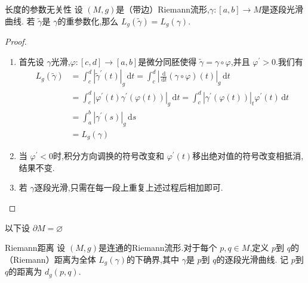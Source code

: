 \documentclass[../../几何与拓扑.tex]{subfiles}
\begin{document}
\begin{proposition}{长度的参数无关性}
    设 $ \left( M,g \right)  $是（带边）Riemann流形,$ \gamma:[a,b]\to M $是逐段光滑曲线.
    若 $ \tilde{\gamma} $是 $ \gamma $的重参数化,那么 $ L_{g}\left( \tilde{\gamma} \right)=L_{g}\left( \gamma \right)   $.     
\end{proposition}
\begin{proof}
    \begin{enumerate}
        \item 首先设 $ \gamma $光滑,$ \varphi:[c,d]\to [a,b] $是微分同胚使得 $ \tilde{\gamma}=\gamma\circ \varphi $,并且 $ \varphi^{\prime} >0 $.我们有 $$
        \begin{aligned}
        L_{g}\left( \tilde{\gamma} \right)  & = \int_{c}^{d}\left| \tilde{\gamma}^{\prime} \left( t \right)  \right|_{g} \,\mathrm{d} t=  \int_{c}^{d}\left| \frac{\,\mathrm{d}  }{\,\mathrm{d} t }  \left( \gamma\circ \varphi \right)\left( t \right)  \right|_{g}\,\mathrm{d} t\\ 
         & = \int_{c}^{d} \left| \varphi^{\prime} \left( t \right)\gamma^{\prime} \left( \varphi\left( t \right)  \right)   \right|_{g}  \,\mathrm{d} t = \int_{c}^{d} \left| \gamma^{\prime} \left( \varphi\left( t \right)  \right)  \right|_{t} \varphi^{\prime} \left( t \right)\,\mathrm{d} t\\ 
          & = \int_{a}^{b}  \left| \gamma^{\prime} \left( s \right)  \right| _{g}\,\mathrm{d} s\\ 
           & = L_{g}\left( \gamma \right) 
        \end{aligned}
        $$     
        \item 当 $ \varphi^{\prime} <0 $时,积分方向调换的符号改变和 $ \varphi^{\prime} \left( t \right)  $移出绝对值的符号改变相抵消,结果不变.
        \item 若 $ \gamma $逐段光滑,只需在每一段上重复上述过程后相加即可. 
    \end{enumerate}
    
\end{proof}

以下设 $ \partial M = \varnothing $ 

\begin{definition}{Riemann距离}
    设 $ \left( M,g \right)  $是连通的Riemann流形.对于每个 $ p,q\in M $,定义 $ p $到 $ q $的（Riemann）距离为全体 $ L_{g}\left( \gamma \right)  $的下确界,其中 $ \gamma $是 $ p $到 $ q $的逐段光滑曲线.
    记 $ p $到 $ q $的距离为 $ d _{g}\left( p,q \right)  $.           
\end{definition}
\end{document}
